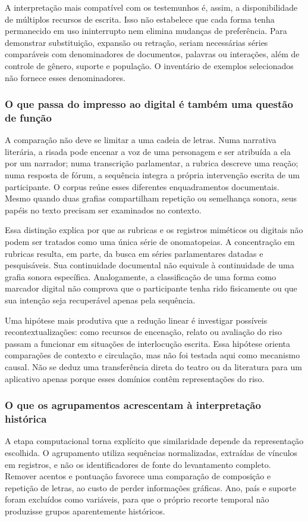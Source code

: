 A interpretação mais compatível com os testemunhos é, assim, a disponibilidade de múltiplos recursos de escrita. Isso não estabelece que cada forma tenha permanecido em uso ininterrupto nem elimina mudanças de preferência. Para demonstrar substituição, expansão ou retração, seriam necessárias séries comparáveis com denominadores de documentos, palavras ou interações, além de controle de gênero, suporte e população. O inventário de exemplos selecionados não fornece esses denominadores.

\subsubsection{O que passa do impresso ao digital é também uma questão de função}
A comparação não deve se limitar a uma cadeia de letras. Numa narrativa literária, a risada pode encenar a voz de uma personagem e ser atribuída a ela por um narrador; numa transcrição parlamentar, a rubrica descreve uma reação; numa resposta de fórum, a sequência integra a própria intervenção escrita de um participante. O corpus reúne esses diferentes enquadramentos documentais. Mesmo quando duas grafias compartilham repetição ou semelhança sonora, seus papéis no texto precisam ser examinados no contexto.

Essa distinção explica por que as \CoreRubrics{} rubricas e os \CoreMimetic{} registros miméticos ou digitais não podem ser tratados como uma única série de onomatopeias. A concentração em rubricas resulta, em parte, da busca em séries parlamentares datadas e pesquisáveis. Sua continuidade documental não equivale à continuidade de uma grafia sonora específica. Analogamente, a classificação de uma forma como marcador digital não comprova que o participante tenha rido fisicamente ou que sua intenção seja recuperável apenas pela sequência.

Uma hipótese mais produtiva que a redução linear é investigar possíveis recontextualizações: como recursos de encenação, relato ou avaliação do riso passam a funcionar em situações de interlocução escrita. Essa hipótese orienta comparações de contexto e circulação, mas não foi testada aqui como mecanismo causal. Não se deduz uma transferência direta do teatro ou da literatura para um aplicativo apenas porque esses domínios contêm representações do riso.

\subsubsection{O que os agrupamentos acrescentam à interpretação histórica}
A etapa computacional torna explícito que similaridade depende da representação escolhida. O agrupamento utiliza \AnalysisForms{} sequências normalizadas, extraídas de \AnalysisVariants{} vínculos em \CoreMimetic{} registros, e não os \EvidenceSources{} identificadores de fonte do levantamento completo. Remover acentos e pontuação favorece uma comparação de composição e repetição de letras, ao custo de perder informações gráficas. Ano, país e suporte foram excluídos como variáveis, para que o próprio recorte temporal não produzisse grupos aparentemente históricos.

